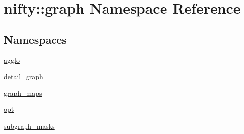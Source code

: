 \hypertarget{namespacenifty_1_1graph}{}\section{nifty\+:\+:graph Namespace Reference}
\label{namespacenifty_1_1graph}
\subsection*{Namespaces}
\begin{DoxyCompactItemize}
\item 
 \hyperlink{namespacenifty_1_1graph_1_1agglo}{agglo}
\item 
 \hyperlink{namespacenifty_1_1graph_1_1detail__graph}{detail\+\_\+graph}
\item 
 \hyperlink{namespacenifty_1_1graph_1_1graph__maps}{graph\+\_\+maps}
\item 
 \hyperlink{namespacenifty_1_1graph_1_1opt}{opt}
\item 
 \hyperlink{namespacenifty_1_1graph_1_1subgraph__masks}{subgraph\+\_\+masks}
\end{DoxyCompactItemize}
